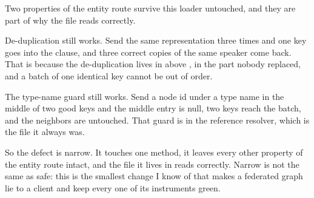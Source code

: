 %
Two properties of the entity route survive this loader untouched, and they are
part of why the file reads correctly.

De-duplication still works. Send the same representation three times and one
key goes into the  clause, and three correct copies of the same
speaker come back. That is because the de-duplication lives in
 above , in the part nobody replaced, and
a batch of one identical key cannot be out of order.

%
The type-name guard still works. Send a  node id under a
 type name in the middle of two good keys and the middle entry is
null, two keys reach the batch, and the neighbors are untouched. That guard is
in the reference resolver, which is the file it always was.

%
So the defect is narrow. It touches one method, it leaves every other property
of the entity route intact, and the file it lives in reads correctly. Narrow is
not the same as safe: this is the smallest change I
know of that makes a federated graph lie to a client and keep every one of its
instruments green.
%
